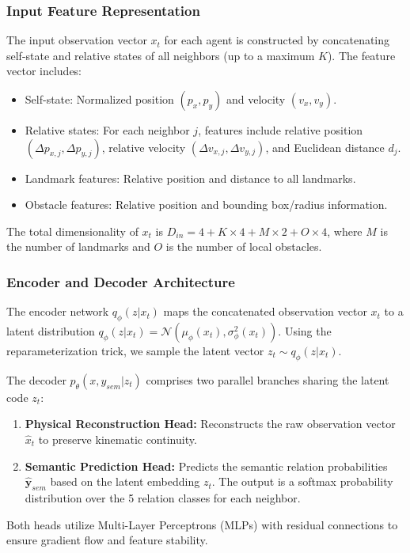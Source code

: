 \documentclass[conference]{IEEEtran}
\begin{document}
\subsubsection{Input Feature Representation}
The input observation vector $x_t$ for each agent is constructed by concatenating self-state and relative states of all neighbors (up to a maximum $K$). The feature vector includes:
\begin{itemize}
    \item Self-state: Normalized position $(p_x, p_y)$ and velocity $(v_x, v_y)$.
    \item Relative states: For each neighbor $j$, features include relative position $(\Delta p_{x,j}, \Delta p_{y,j})$, relative velocity $(\Delta v_{x,j}, \Delta v_{y,j})$, and Euclidean distance $d_j$.
    \item Landmark features: Relative position and distance to all landmarks.
    \item Obstacle features: Relative position and bounding box/radius information.
\end{itemize}
The total dimensionality of $x_t$ is $D_{in} = 4 + K \times 4 + M \times 2 + O \times 4$, where $M$ is the number of landmarks and $O$ is the number of local obstacles.

\subsubsection{Encoder and Decoder Architecture}
The encoder network $q_\phi(z | x_t)$ maps the concatenated observation vector $x_t$ to a latent distribution $q_\phi(z|x_t) = \mathcal{N}(\mu_\phi(x_t), \sigma^2_\phi(x_t))$. Using the reparameterization trick, we sample the latent vector $z_t \sim q_\phi(z|x_t)$.

The decoder $p_\theta(x, y_{sem} | z_t)$ comprises two parallel branches sharing the latent code $z_t$:
\begin{enumerate}
    \item \textbf{Physical Reconstruction Head:} Reconstructs the raw observation vector $\hat{x}_t$ to preserve kinematic continuity.
    \item \textbf{Semantic Prediction Head:} Predicts the semantic relation probabilities $\hat{\mathbf{y}}_{sem}$ based on the latent embedding $z_t$. The output is a softmax probability distribution over the 5 relation classes for each neighbor.
\end{enumerate}
Both heads utilize Multi-Layer Perceptrons (MLPs) with residual connections to ensure gradient flow and feature stability.
\end{document}

